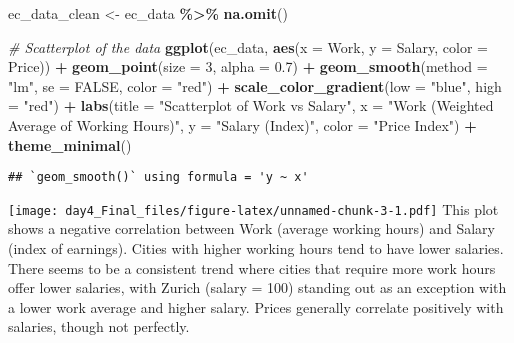 \documentclass[
]{article}
\newenvironment{Shaded}{\begin{snugshade}}{\end{snugshade}}
\newcommand{\AttributeTok}[1]{\textcolor[rgb]{0.13,0.29,0.53}{#1}}
\newcommand{\CommentTok}[1]{\textcolor[rgb]{0.56,0.35,0.01}{\textit{#1}}}
\newcommand{\ConstantTok}[1]{\textcolor[rgb]{0.56,0.35,0.01}{#1}}
\newcommand{\DecValTok}[1]{\textcolor[rgb]{0.00,0.00,0.81}{#1}}
\newcommand{\FloatTok}[1]{\textcolor[rgb]{0.00,0.00,0.81}{#1}}
\newcommand{\FunctionTok}[1]{\textcolor[rgb]{0.13,0.29,0.53}{\textbf{#1}}}
\newcommand{\NormalTok}[1]{#1}
\newcommand{\OtherTok}[1]{\textcolor[rgb]{0.56,0.35,0.01}{#1}}
\newcommand{\SpecialCharTok}[1]{\textcolor[rgb]{0.81,0.36,0.00}{\textbf{#1}}}
\newcommand{\StringTok}[1]{\textcolor[rgb]{0.31,0.60,0.02}{#1}}
\begin{document}
\begin{Shaded}
\begin{Highlighting}[]
\NormalTok{ec\_data\_clean }\OtherTok{\textless{}{-}}\NormalTok{ ec\_data }\SpecialCharTok{\%\textgreater{}\%} \FunctionTok{na.omit}\NormalTok{()}
\end{Highlighting}
\end{Shaded}

\begin{Shaded}
\begin{Highlighting}[]
\CommentTok{\# Scatterplot of the data}
\FunctionTok{ggplot}\NormalTok{(ec\_data, }\FunctionTok{aes}\NormalTok{(}\AttributeTok{x =}\NormalTok{ Work, }\AttributeTok{y =}\NormalTok{ Salary, }\AttributeTok{color =}\NormalTok{ Price)) }\SpecialCharTok{+}
  \FunctionTok{geom\_point}\NormalTok{(}\AttributeTok{size =} \DecValTok{3}\NormalTok{, }\AttributeTok{alpha =} \FloatTok{0.7}\NormalTok{) }\SpecialCharTok{+}
  \FunctionTok{geom\_smooth}\NormalTok{(}\AttributeTok{method =} \StringTok{"lm"}\NormalTok{, }\AttributeTok{se =} \ConstantTok{FALSE}\NormalTok{, }\AttributeTok{color =} \StringTok{"red"}\NormalTok{) }\SpecialCharTok{+} 
  \FunctionTok{scale\_color\_gradient}\NormalTok{(}\AttributeTok{low =} \StringTok{"blue"}\NormalTok{, }\AttributeTok{high =} \StringTok{"red"}\NormalTok{) }\SpecialCharTok{+}
  \FunctionTok{labs}\NormalTok{(}\AttributeTok{title =} \StringTok{"Scatterplot of Work vs Salary"}\NormalTok{,}
       \AttributeTok{x =} \StringTok{"Work (Weighted Average of Working Hours)"}\NormalTok{,}
       \AttributeTok{y =} \StringTok{"Salary (Index)"}\NormalTok{,}
       \AttributeTok{color =} \StringTok{"Price Index"}\NormalTok{) }\SpecialCharTok{+}
  \FunctionTok{theme\_minimal}\NormalTok{()}
\end{Highlighting}
\end{Shaded}

\begin{verbatim}
## `geom_smooth()` using formula = 'y ~ x'
\end{verbatim}

\texttt{[image: day4\_Final\_files/figure-latex/unnamed-chunk-3-1.pdf]}
This plot shows a negative correlation between Work (average working
hours) and Salary (index of earnings). Cities with higher working hours
tend to have lower salaries. There seems to be a consistent trend where
cities that require more work hours offer lower salaries, with Zurich
(salary = 100) standing out as an exception with a lower work average
and higher salary. Prices generally correlate positively with salaries,
though not perfectly.
\end{document}
